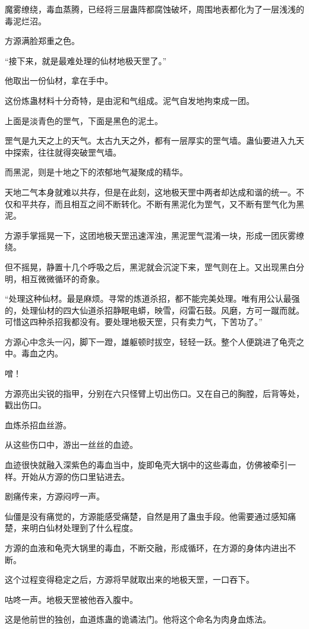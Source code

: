 \begin{this_body}
魔雾缭绕，毒血蒸腾，已经将三层蛊阵都腐蚀破坏，周围地表都化为了一层浅浅的毒泥烂沼。

方源满脸郑重之色。

“接下来，就是最难处理的仙材地极天罡了。”

他取出一份仙材，拿在手中。

这份炼蛊材料十分奇特，是由泥和气组成。泥气自发地拘束成一团。

上面是淡青色的罡气，下面是黑色的泥土。

罡气是九天之上的天气。太古九天之外，都有一层厚实的罡气墙。蛊仙要进入九天中探索，往往就得突破罡气墙。

而黑泥，则是十地之下的浓郁地气凝聚成的精华。

天地二气本身就难以共存，但是在此刻，这地极天罡中两者却达成和谐的统一。不仅和平共存，而且相互之间不断转化。不断有黑泥化为罡气，又不断有罡气化为黑泥。

方源手掌摇晃一下，这团地极天罡迅速浑浊，黑泥罡气混淆一块，形成一团灰雾缭绕。

但不摇晃，静置十几个呼吸之后，黑泥就会沉淀下来，罡气则在上。又出现黑白分明，相互微微循环的奇象。

“处理这种仙材。最是麻烦。寻常的炼道杀招，都不能完美处理。唯有用公认最强的，处理仙材的四大仙道杀招静眠电蟒，映雪，闷雷石鼓。风磨，方可一蹴而就。可惜这四种杀招我都没有。要处理地极天罡，只有卖力气，下苦功了。”

方源心中念头一闪，脚下一蹬，雄躯顿时拔空，轻轻一跃。整个人便跳进了龟壳之中。毒血之内。

噌！

方源亮出尖锐的指甲，分别在六只怪臂上切出伤口。又在自己的胸膛，后背等处，戳出伤口。

血炼杀招血丝游。

从这些伤口中，游出一丝丝的血迹。

血迹很快就融入深紫色的毒血当中，旋即龟壳大锅中的这些毒血，仿佛被牵引一样。开始从方源的伤口里钻进去。

剧痛传来，方源闷哼一声。

仙僵是没有痛觉的，方源能感受痛楚，自然是用了蛊虫手段。他需要通过感知痛楚，来明白仙材处理到了什么程度。

方源的血液和龟壳大锅里的毒血，不断交融，形成循环，在方源的身体内进出不断。

这个过程变得稳定之后，方源将早就取出来的地极天罡，一口吞下。

咕咚一声。地极天罡被他吞入腹中。

这是他前世的独创，血道炼蛊的诡谲法门。他将这个命名为肉身血炼法。


\end{this_body}
